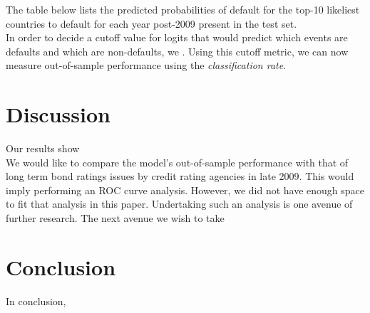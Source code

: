 \documentclass[12pt]{article}
\begin{document}
The table below lists the predicted probabilities of default for the top-10 likeliest countries to default for each year post-2009 present in the test set. \\

In order to decide a cutoff value for logits that would predict which events are defaults and which are non-defaults, we . Using this cutoff metric, we can now measure out-of-sample performance using the \textit{classification rate}.

\section{Discussion} \label{sec:discussion}

Our results show \\

We would like to compare the model's out-of-sample performance with that of long term bond ratings issues by credit rating agencies in late 2009. This would imply performing an ROC curve analysis. However, we did not have enough space to fit that analysis in this paper. Undertaking such an analysis is one avenue of further research. The next avenue we wish to take

\section{Conclusion} \label{sec:conclusion}

In conclusion, 



\singlespacing
\setlength\bibsep{0pt}




\clearpage

\onehalfspacing




\clearpage


\end{document}
